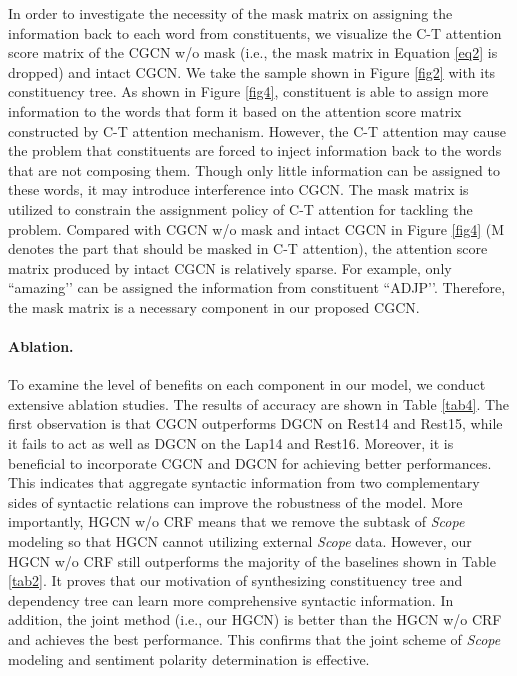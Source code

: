 \documentclass{article}
\begin{document}
In order to investigate the necessity of the mask matrix on assigning the information back to each word from constituents, we visualize the C-T attention score matrix of the CGCN w/o mask (i.e., the mask matrix  in Equation \ref{eq2} is dropped) and intact CGCN. We take the sample shown in Figure \ref{fig2} with its constituency tree. As shown in Figure \ref{fig4}, constituent is able to assign more information to the words that form it based on the attention score matrix constructed by C-T attention mechanism. However, the C-T attention may cause the problem that constituents are forced to inject information back to the words that are not composing them. Though only little information can be assigned to these words, it may introduce interference into CGCN. The mask matrix is utilized to constrain the assignment policy of C-T attention for tackling the problem. Compared with CGCN w/o mask and intact CGCN in Figure \ref{fig4} (M denotes the part that should be masked in C-T attention), the attention score matrix produced by intact CGCN is relatively sparse. For example, only ``amazing’’ can be assigned the information from constituent ``ADJP’’. Therefore, the mask matrix is a necessary component in our proposed CGCN.

\paragraph{Ablation.}

To examine the level of benefits on each component in our model, we conduct extensive ablation studies. The results of accuracy are shown in Table \ref{tab4}. The first observation is that CGCN outperforms DGCN on Rest14 and Rest15, while it fails to act as well as DGCN on the Lap14 and Rest16. Moreover, it is beneficial to incorporate CGCN and DGCN for achieving better performances. This indicates that aggregate syntactic information from two complementary sides of syntactic relations can improve the robustness of the model. More importantly, HGCN w/o CRF means that we remove the subtask of \emph{Scope} modeling so that HGCN cannot utilizing external \emph{Scope} data. However, our HGCN w/o CRF still outperforms the majority of the baselines shown in Table \ref{tab2}. It proves that our motivation of synthesizing constituency tree and dependency tree can learn more comprehensive syntactic information. In addition, the joint method (i.e., our HGCN) is better than the HGCN w/o CRF and achieves the best performance. This confirms that the joint scheme of \emph{Scope} modeling and sentiment polarity determination is effective.
\end{document}
